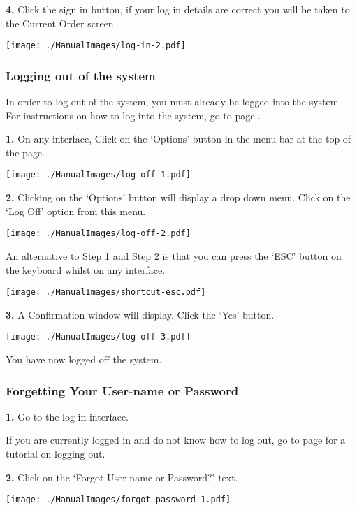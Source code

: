 \textbf{4.} Click the sign in button, if your log in details are correct you will be taken to the Current Order screen.

\texttt{[image: ./ManualImages/log-in-2.pdf]}

\pagebreak
\subsubsection{Logging out of the system}
\label{fig:Logging out of the system}

In order to log out of the system, you must already be logged into the system. For instructions on how to log into the system, go to page \pageref{fig:Logging into the system}.

\textbf{1.}  On any interface, Click on the `Options' button in the menu bar at the top of the page.

\texttt{[image: ./ManualImages/log-off-1.pdf]}

\textbf{2.} Clicking on the `Options' button will display a drop down menu. Click on the `Log Off' option from this menu.

\texttt{[image: ./ManualImages/log-off-2.pdf]}

An alternative to Step 1 and Step 2 is that you can press the `ESC' button on the keyboard whilst on any interface.

\texttt{[image: ./ManualImages/shortcut-esc.pdf]}

\textbf{3.} A Confirmation window will display. Click the `Yes' button.

\texttt{[image: ./ManualImages/log-off-3.pdf]}

You have now logged off the system.

\pagebreak
\subsubsection{Forgetting Your User-name or Password}
\label{fig:Forgetting Your User-name or Password}

\textbf{1.} Go to the log in interface.

If you are currently logged in and do not know how to log out, go to page \pageref{fig:Logging out of the system}  for a tutorial on logging out.

\textbf{2.} Click on the `Forgot User-name or Password?' text.

\texttt{[image: ./ManualImages/forgot-password-1.pdf]}

